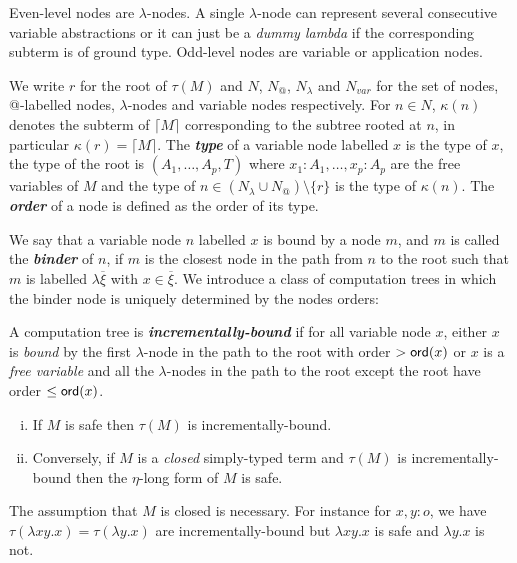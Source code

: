 \documentclass{llncs}
\newcommand\defname[1]{{\bf\em #1}\index{#1}}
\newcommand{\elnf}[1]{\lceil #1\rceil} %
\newcommand\union{\cup}
\begin{document}
Even-level nodes are $\lambda$-nodes. A single $\lambda$-node can
represent several consecutive variable abstractions or it can just be
a \emph{dummy lambda} if the corresponding subterm is of ground type.
Odd-level nodes are variable or application nodes.

We write $r$ for the root of $\tau(M)$ and $N$, $N_@$, $N_\lambda$ and
$N_{var}$ for the set of nodes, @-labelled nodes, $\lambda$-nodes and
variable nodes respectively.  For $n \in N$, $\kappa(n)$ denotes the
subterm of $\elnf{M}$ corresponding to the subtree rooted at $n$, in
particular $\kappa(r) = \elnf{M}$.  The \defname{type} of a variable
node labelled $x$ is the type of $x$, the type of the root is
$(A_1,\ldots,A_p, T)$ where $x_1:A_1,\ldots, x_p:A_p$ are the free
variables of $M$ and the type of $n\in (N_\lambda \union N_@)
\setminus \{ r \}$ is the type of $\kappa(n)$. The \defname{order} of
a node is defined as the order of its type.

We say that a variable node $n$ labelled $x$ is bound by a node $m$,
and $m$ is called the \defname{binder} of $n$, if $m$ is the closest
node in the path from $n$ to the root such that $m$ is labelled
$\lambda \overline{\xi}$ with $x\in \overline{\xi}$.
We introduce a class of computation trees in which the binder
node is uniquely determined by the nodes orders:
\begin{definition}\rm
  A computation tree is \defname{incrementally-bound} if for all
  variable node $x$, either $x$ is \emph{bound} by the first
  $\lambda$-node in the path to the root with order $> {\sf ord}(x)$ or $x$
  is a \emph{free variable} and all the $\lambda$-nodes in the path to
  the root except the root have order $\leq {\sf ord}(x)$.
\end{definition}

\begin{proposition} %
\label{prop:safe_imp_incrbound}
\begin{enumerate}[(i)]
\item If $M$ is safe then $\tau(M)$ is incrementally-bound. 
\item Conversely, if $M$ is a \emph{closed} simply-typed term and $\tau(M)$
is incrementally-bound then the $\eta$-long form of $M$ is safe.
\end{enumerate}
\end{proposition}

The assumption that $M$ is closed is necessary. For instance for
$x,y:o$, we have $\tau(\lambda x y .x) = \tau(\lambda y . x)$ are
incrementally-bound but $\lambda x y .x$ is safe and $\lambda y . x$
is not.
\end{document}
